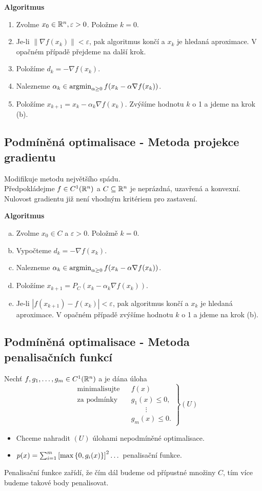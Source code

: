 \textbf{Algoritmus}
\begin{enumerate}
    \item Zvolme $x_0 \in \mathbb{R}^n, \varepsilon > 0$. Položme $k = 0$.
    \item Je-li $\| \nabla f(x_k)\| < \varepsilon$, pak algoritmus končí a $x_k$ je hledaná aproximace. V opačném 
    případě přejdeme na další krok.
    \item Položíme $d_k = -\nabla f(x_k)$.
    \item Nalezneme $\alpha_k \in \operatorname*{argmin}_{\alpha \geq 0} f(x_k - \alpha \nabla f(x_k))$.
    \item Položíme $x_{k+1} = x_k - \alpha_k \nabla f(x_k)$. Zvýšíme hodnotu $k$ o 1 a jdeme na krok (b).
\end{enumerate}

\subsection{Podmíněná optimalisace - Metoda projekce gradientu}
Modifikuje metodu největšího spádu.\\
Předpokládejme $f \in C^1 (\mathbb{R}^n)$ a $C \subseteq \mathbb{R}^n$ je neprázdná, uzavřená a konvexní.\\
Nulovost gradientu již není vhodným kritériem pro zastavení.

\textbf{Algoritmus}
\begin{enumerate}[(a)]
    \item Zvolme $x_0 \in C$ a $\varepsilon > 0$. Položmě $k = 0$.
    \item Vypočteme $d_k = -\nabla f(x_k)$.
    \item Nalezneme $\alpha_k \in \operatorname*{argmin}_{\alpha \geq 0} f(x_k - \alpha \nabla f(x_k))$.
    \item Položíme $x_{k+1} = P_C (x_k - \alpha_k \nabla f(x_k))$.
    \item Je-li $|f(x_{k+1}) - f(x_k)| < \varepsilon$, pak algoritmus končí a $x_k$ je hledaná aproximace. V opačném 
    případě zvýšíme hodnotu $k$ o 1 a jdeme na krok (b).
\end{enumerate}

\subsection{Podmíněná optimalisace - Metoda penalisačních funkcí}
Nechť $f, g_1, \dots, g_m \in C^1(\mathbb{R}^n)$ a je dána úloha
\[
\left.\begin{aligned}
    &\text{minimalisujte}&& f(x) \\
    &\text{za podmínky}  && g_1(x) \leq 0, \\
    & && \quad \quad \vdots \\
    & && g_m(x) \leq 0. 
\end{aligned}
\right\} (U)
\]
\begin{itemize}
    \item Chceme nahradit $(U)$ úlohami nepodmíněné optimalisace.
    \item $p(x) = \sum_{i=1}^{m} \left[\max \left\lbrace 0, g_i(x) \right\rbrace\right]^2 \dots$ penalisační funkce. 
\end{itemize}
Penalisační funkce zařídí, že čím dál budeme od přípustné množiny $C$, tím více budeme takové body penalisovat.

